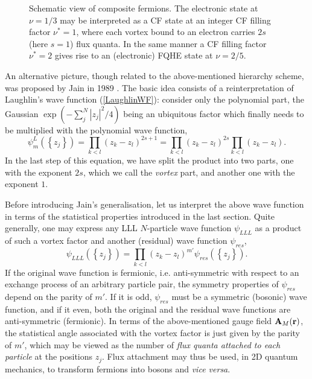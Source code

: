 \documentclass[10pt]{book}
\newcommand{\br}{{\bf r}}
\newcommand{\bA}{{\bf A}}
\newcommand{\beq}{\begin{equation}}
\newcommand{\eeq}{\end{equation}}
\begin{document}
\begin{figure}
\begin{center}
\end{center}
\caption{ Schematic view of composite fermions. The electronic state at $\nu=1/3$ may be interpreted as a CF state at an
integer CF filling factor $\nu^*=1$, where each vortex bound to an electron carries $2s$ (here $s=1$) flux quanta. In 
the same manner a CF filling factor $\nu^*=2$ gives rise to an (electronic) FQHE state at $\nu=2/5$.}
\label{fig23}
\end{figure}


An alternative picture, though related to the above-mentioned hierarchy scheme, was proposed by Jain in 1989 \cite{Jain1,Jain2}. 
The basic idea
consists of a reinterpretation of Laughlin's wave function (\ref{LaughlinWF}): consider only the polynomial part, the Gaussian
$\exp(-\sum_j^N|z_j|^2/4)$ being an ubiquitous factor which finally needs to be multiplied with the polynomial wave function,
\beq\label{LaughlinDec}
\psi_{m}^L\left(\left\{z_j\right\}\right) = \prod_{k<l}(z_k - z_l)^{2s+1} = \prod_{k<l}(z_k - z_l)^{2s}\prod_{k<l}(z_k - z_l).
\eeq
In the last step of this equation, we have split the product into two parts, one with the exponent $2s$, which
we call the {\sl vortex} part, and another one with the exponent $1$. 

Before introducing Jain's generalisation, let us interpret the above wave function in terms of the statistical properties
introduced in the last section. Quite generally, one may express any LLL $N$-particle wave function $\psi_{LLL}$
as a product of such
a vortex factor and another (residual) wave function $\psi_{res}$, %
$$
\psi_{LLL}\left(\left\{z_j\right\}\right) = \prod_{k<l}(z_k - z_l)^{m'}\psi_{res}\left(\left\{z_j\right\}\right).
$$
If the original wave function is fermionic, i.e. anti-symmetric with respect to an exchange process of an arbitrary particle
pair, the symmetry properties of $\psi_{res}$ depend on the parity of $m'$. If it is odd, $\psi_{res}$ must be a symmetric (bosonic)
wave function, and if it even, both the original and the residual wave functions are 
anti-symmetric (fermionic). In terms of the above-mentioned
gauge field $\bA_M(\br)$, the statistical angle associated with the vortex factor is just given by the parity of $m'$, which
may be viewed as the number of {\sl flux quanta attached to each particle} at the positions $z_j$. Flux attachment may thus
be used, in 2D quantum mechanics, to transform fermions into bosons and {\sl vice versa}. 
\end{document}
